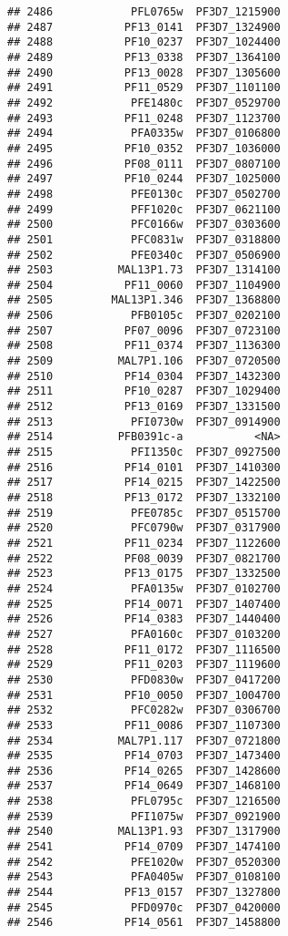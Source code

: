 \documentclass{article}\usepackage[]{graphicx}\usepackage[]{color}
\makeatletter
\newenvironment{kframe}{%
 \def\at@end@of@kframe{}%
 \ifinner\ifhmode%
  \def\at@end@of@kframe{\end{minipage}}%
  \begin{minipage}{\columnwidth}%
 \fi\fi%
 \def\FrameCommand##1{\hskip\@totalleftmargin \hskip-\fboxsep
 \colorbox{shadecolor}{##1}\hskip-\fboxsep
     \hskip-\linewidth \hskip-\@totalleftmargin \hskip\columnwidth}%
 \MakeFramed {\advance\hsize-\width
   \@totalleftmargin\z@ \linewidth\hsize
   \@setminipage}}%
 {\par\unskip\endMakeFramed%
 \at@end@of@kframe}
\newenvironment{knitrout}{}{} %
\makeatother
\begin{document}
\begin{knitrout}
\begin{kframe}
\begin{verbatim}
## 2486            PFL0765w  PF3D7_1215900
## 2487           PF13_0141  PF3D7_1324900
## 2488           PF10_0237  PF3D7_1024400
## 2489           PF13_0338  PF3D7_1364100
## 2490           PF13_0028  PF3D7_1305600
## 2491           PF11_0529  PF3D7_1101100
## 2492            PFE1480c  PF3D7_0529700
## 2493           PF11_0248  PF3D7_1123700
## 2494            PFA0335w  PF3D7_0106800
## 2495           PF10_0352  PF3D7_1036000
## 2496           PF08_0111  PF3D7_0807100
## 2497           PF10_0244  PF3D7_1025000
## 2498            PFE0130c  PF3D7_0502700
## 2499            PFF1020c  PF3D7_0621100
## 2500            PFC0166w  PF3D7_0303600
## 2501            PFC0831w  PF3D7_0318800
## 2502            PFE0340c  PF3D7_0506900
## 2503          MAL13P1.73  PF3D7_1314100
## 2504           PF11_0060  PF3D7_1104900
## 2505         MAL13P1.346  PF3D7_1368800
## 2506            PFB0105c  PF3D7_0202100
## 2507           PF07_0096  PF3D7_0723100
## 2508           PF11_0374  PF3D7_1136300
## 2509          MAL7P1.106  PF3D7_0720500
## 2510           PF14_0304  PF3D7_1432300
## 2511           PF10_0287  PF3D7_1029400
## 2512           PF13_0169  PF3D7_1331500
## 2513            PFI0730w  PF3D7_0914900
## 2514          PFB0391c-a           <NA>
## 2515            PFI1350c  PF3D7_0927500
## 2516           PF14_0101  PF3D7_1410300
## 2517           PF14_0215  PF3D7_1422500
## 2518           PF13_0172  PF3D7_1332100
## 2519            PFE0785c  PF3D7_0515700
## 2520            PFC0790w  PF3D7_0317900
## 2521           PF11_0234  PF3D7_1122600
## 2522           PF08_0039  PF3D7_0821700
## 2523           PF13_0175  PF3D7_1332500
## 2524            PFA0135w  PF3D7_0102700
## 2525           PF14_0071  PF3D7_1407400
## 2526           PF14_0383  PF3D7_1440400
## 2527            PFA0160c  PF3D7_0103200
## 2528           PF11_0172  PF3D7_1116500
## 2529           PF11_0203  PF3D7_1119600
## 2530            PFD0830w  PF3D7_0417200
## 2531           PF10_0050  PF3D7_1004700
## 2532            PFC0282w  PF3D7_0306700
## 2533           PF11_0086  PF3D7_1107300
## 2534          MAL7P1.117  PF3D7_0721800
## 2535           PF14_0703  PF3D7_1473400
## 2536           PF14_0265  PF3D7_1428600
## 2537           PF14_0649  PF3D7_1468100
## 2538            PFL0795c  PF3D7_1216500
## 2539            PFI1075w  PF3D7_0921900
## 2540          MAL13P1.93  PF3D7_1317900
## 2541           PF14_0709  PF3D7_1474100
## 2542            PFE1020w  PF3D7_0520300
## 2543            PFA0405w  PF3D7_0108100
## 2544           PF13_0157  PF3D7_1327800
## 2545            PFD0970c  PF3D7_0420000
## 2546           PF14_0561  PF3D7_1458800

\end{verbatim}
\end{kframe}
\end{knitrout}
\end{document}
